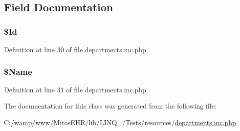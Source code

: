 \subsection{\-Field \-Documentation}
\hypertarget{class_department_ae24f09f6f3375b938ae2625f53cea439}{
\subsubsection[{\$\-Id}]{\setlength{\rightskip}{0pt plus 5cm}\$\-Id}}\label{class_department_ae24f09f6f3375b938ae2625f53cea439}


\-Definition at line 30 of file departments.\-inc.\-php.

\hypertarget{class_department_a90efb261c13e9a3e16ed2b0563dec08d}{
\subsubsection[{\$\-Name}]{\setlength{\rightskip}{0pt plus 5cm}\$\-Name}}\label{class_department_a90efb261c13e9a3e16ed2b0563dec08d}


\-Definition at line 31 of file departments.\-inc.\-php.



\-The documentation for this class was generated from the following file\-:\begin{DoxyCompactItemize}
\item 
\-C\-:/wamp/www/\-Mitos\-E\-H\-R/lib/\-L\-I\-N\-Q\-\_/\-Tests/resources/\hyperlink{departments_8inc_8php}{departments.\-inc.\-php}\end{DoxyCompactItemize}
